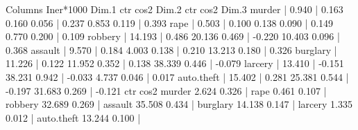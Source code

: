 \documentclass[
]{article}
\newenvironment{Shaded}{\begin{snugshade}}{\end{snugshade}}
\newcommand{\DecValTok}[1]{\textcolor[rgb]{0.00,0.00,0.81}{#1}}
\newcommand{\FloatTok}[1]{\textcolor[rgb]{0.00,0.00,0.81}{#1}}
\newcommand{\NormalTok}[1]{#1}
\newcommand{\SpecialCharTok}[1]{\textcolor[rgb]{0.00,0.00,0.00}{#1}}
\begin{document}
\begin{Shaded}
\begin{Highlighting}[]
\NormalTok{Columns}
\NormalTok{             Iner}\SpecialCharTok{*}\DecValTok{1000}\NormalTok{    Dim}\FloatTok{.1}\NormalTok{    ctr   cos2    Dim}\FloatTok{.2}\NormalTok{    ctr   cos2    Dim}\FloatTok{.3}
\NormalTok{murder     }\SpecialCharTok{|}     \FloatTok{0.940} \SpecialCharTok{|}  \FloatTok{0.163}  \FloatTok{0.160}  \FloatTok{0.056} \SpecialCharTok{|}  \FloatTok{0.237}  \FloatTok{0.853}  \FloatTok{0.119} \SpecialCharTok{|}  \FloatTok{0.393}
\NormalTok{rape       }\SpecialCharTok{|}     \FloatTok{0.503} \SpecialCharTok{|}  \FloatTok{0.100}  \FloatTok{0.138}  \FloatTok{0.090} \SpecialCharTok{|}  \FloatTok{0.149}  \FloatTok{0.770}  \FloatTok{0.200} \SpecialCharTok{|}  \FloatTok{0.109}
\NormalTok{robbery    }\SpecialCharTok{|}    \FloatTok{14.193} \SpecialCharTok{|}  \FloatTok{0.486} \FloatTok{20.136}  \FloatTok{0.469} \SpecialCharTok{|} \SpecialCharTok{{-}}\FloatTok{0.220} \FloatTok{10.403}  \FloatTok{0.096} \SpecialCharTok{|}  \FloatTok{0.368}
\NormalTok{assault    }\SpecialCharTok{|}     \FloatTok{9.570} \SpecialCharTok{|}  \FloatTok{0.184}  \FloatTok{4.003}  \FloatTok{0.138} \SpecialCharTok{|}  \FloatTok{0.210} \FloatTok{13.213}  \FloatTok{0.180} \SpecialCharTok{|}  \FloatTok{0.326}
\NormalTok{burglary   }\SpecialCharTok{|}    \FloatTok{11.226} \SpecialCharTok{|}  \FloatTok{0.122} \FloatTok{11.952}  \FloatTok{0.352} \SpecialCharTok{|}  \FloatTok{0.138} \FloatTok{38.339}  \FloatTok{0.446} \SpecialCharTok{|} \SpecialCharTok{{-}}\FloatTok{0.079}
\NormalTok{larcery    }\SpecialCharTok{|}    \FloatTok{13.410} \SpecialCharTok{|} \SpecialCharTok{{-}}\FloatTok{0.151} \FloatTok{38.231}  \FloatTok{0.942} \SpecialCharTok{|} \SpecialCharTok{{-}}\FloatTok{0.033}  \FloatTok{4.737}  \FloatTok{0.046} \SpecialCharTok{|}  \FloatTok{0.017}
\NormalTok{auto.theft }\SpecialCharTok{|}    \FloatTok{15.402} \SpecialCharTok{|}  \FloatTok{0.281} \FloatTok{25.381}  \FloatTok{0.544} \SpecialCharTok{|} \SpecialCharTok{{-}}\FloatTok{0.197} \FloatTok{31.683}  \FloatTok{0.269} \SpecialCharTok{|} \SpecialCharTok{{-}}\FloatTok{0.121}
\NormalTok{              ctr   cos2  }
\NormalTok{murder      }\FloatTok{2.624}  \FloatTok{0.326} \SpecialCharTok{|}
\NormalTok{rape        }\FloatTok{0.461}  \FloatTok{0.107} \SpecialCharTok{|}
\NormalTok{robbery    }\FloatTok{32.689}  \FloatTok{0.269} \SpecialCharTok{|}
\NormalTok{assault    }\FloatTok{35.508}  \FloatTok{0.434} \SpecialCharTok{|}
\NormalTok{burglary   }\FloatTok{14.138}  \FloatTok{0.147} \SpecialCharTok{|}
\NormalTok{larcery     }\FloatTok{1.335}  \FloatTok{0.012} \SpecialCharTok{|}
\NormalTok{auto.theft }\FloatTok{13.244}  \FloatTok{0.100} \SpecialCharTok{|}

\end{Highlighting}
\end{Shaded}
\end{document}
